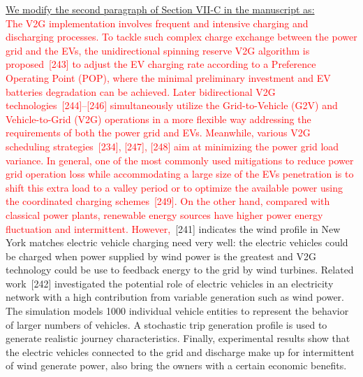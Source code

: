 \documentclass[onecolumn]{IEEEconf}
\begin{document}
\begin{description}
\underline{We modify the second paragraph of Section VII-C in the manuscript as:}\\
\textcolor{red}{The V2G implementation involves frequent and intensive charging and discharging processes. To tackle such complex charge exchange between the power grid and the EVs, the unidirectional spinning reserve V2G algorithm is proposed~[243] to adjust the EV charging rate according to a Preference Operating Point (POP), where the minimal preliminary investment and EV batteries degradation can be achieved.  Later bidirectional V2G technologies~[244]--[246] simultaneously utilize the Grid-to-Vehicle (G2V) and Vehicle-to-Grid (V2G) operations in a more flexible way addressing the requirements of both the power grid and EVs. Meanwhile, various V2G scheduling strategies~[234], [247], [248] aim at minimizing the power grid load variance. In general, one of the most commonly used mitigations to reduce power grid operation loss while accommodating a large size of the EVs penetration is to shift this extra load to a valley period or to optimize the available power using the coordinated charging schemes~[249]. On the other hand, 
compared with classical power plants, renewable energy sources have higher power energy fluctuation and intermittent. However,}~[241] indicates the wind profile in New York matches electric vehicle charging need very well: the electric vehicles could be charged when power supplied by wind power is the greatest and V2G technology could be use to feedback energy to the grid by wind turbines.
Related work~[242] investigated the potential role of electric vehicles in an electricity network with a high contribution from variable generation such as wind power. The simulation models 1000 individual vehicle entities to represent the behavior of larger numbers of vehicles. 
A stochastic trip generation profile is used to generate realistic journey characteristics. 
Finally, experimental results show that the electric vehicles connected to the grid and discharge make up for intermittent of wind generate power, also bring the owners with a certain economic benefits.
\\
\end{description}
\end{document}
